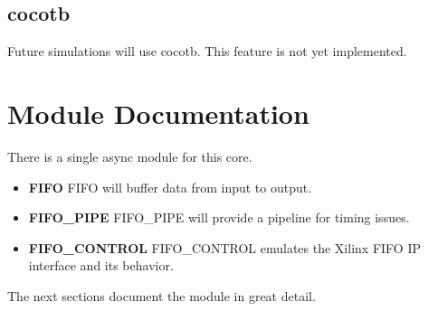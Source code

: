 \subsection{cocotb}
\par
Future simulations will use cocotb. This feature is not yet implemented.

\newpage

\section{Module Documentation} \label{Module Documentation}

\par
There is a single async module for this core.

\begin{itemize}
\item \textbf{FIFO} FIFO will buffer data from input to output.\\
\item \textbf{FIFO\_PIPE} FIFO\_PIPE will provide a pipeline for timing issues.\\
\item \textbf{FIFO\_CONTROL} FIFO\_CONTROL emulates the Xilinx FIFO IP interface and its behavior.\\
\end{itemize}
The next sections document the module in great detail.

